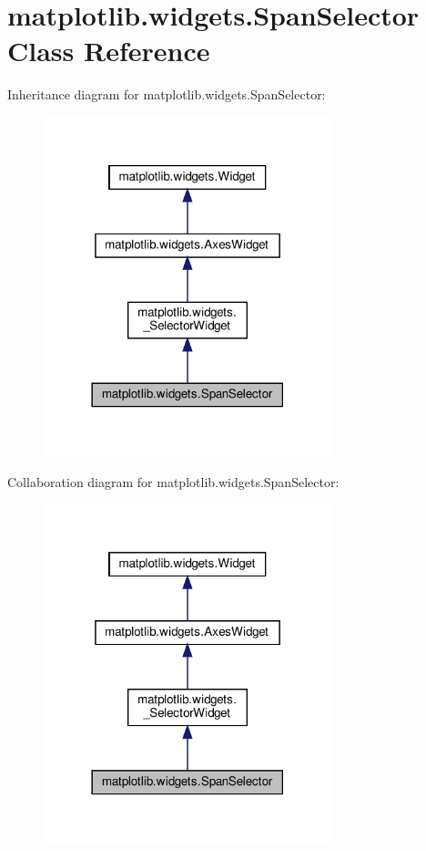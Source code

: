 \hypertarget{classmatplotlib_1_1widgets_1_1SpanSelector}{}\section{matplotlib.\+widgets.\+Span\+Selector Class Reference}
\label{classmatplotlib_1_1widgets_1_1SpanSelector}


Inheritance diagram for matplotlib.\+widgets.\+Span\+Selector\+:
\nopagebreak
\begin{figure}[H]
\begin{center}
\leavevmode
\includegraphics[width=237pt]{classmatplotlib_1_1widgets_1_1SpanSelector__inherit__graph}
\end{center}
\end{figure}


Collaboration diagram for matplotlib.\+widgets.\+Span\+Selector\+:
\nopagebreak
\begin{figure}[H]
\begin{center}
\leavevmode
\includegraphics[width=237pt]{classmatplotlib_1_1widgets_1_1SpanSelector__coll__graph}
\end{center}
\end{figure}
